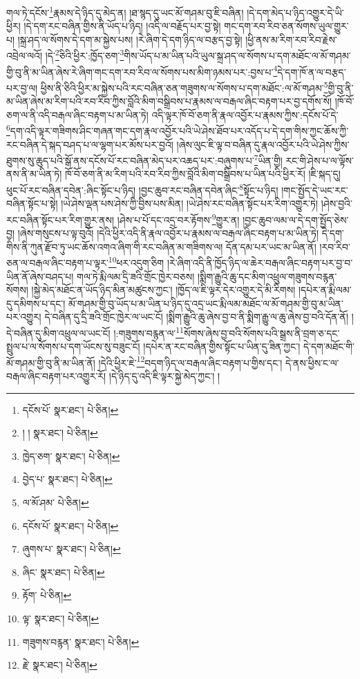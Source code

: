 གལ་ཏེ་དངོས་\footnote{དངོས་པོ་  སྣར་ཐང་།  པེ་ཅིན། }རྣམས་དེ་ཉིད་དུ་མེད་ན། །ཐ་སྙད་དུ་ཡང་མོ་གཤམ་བུ་ཇི་བཞིན། །དེ་དག་མེད་པ་ཉིད་འགྱུར་དེ་ཡི་ཕྱིར། །དེ་དག་རང་བཞིན་གྱིས་ནི་ཡོད་པ་ཉིད། །འདི་ལ་བརྗོད་པར་བྱ་སྟེ། གང་དག་རབ་རིབ་ཅན་སོགས་ཡུལ་གྱུར་པ། །སྐྲ་ཤད་ལ་སོགས་དེ་དག་མ་སྐྱེས་པས། །རེ་ཞིག་དེ་དག་ཉིད་ལ་བརྩད་བྱ་སྟེ། །ཕྱི་ནས་མ་རིག་རབ་རིབ་རྗེས་འབྲེལ་ལའོ། །དེ་\footnote{། །  སྣར་ཐང་།  པེ་ཅིན། }ཅིའི་ཕྱིར་:ཁྱོད་ཅག་\footnote{ཁྱེད་ཅག་  སྣར་ཐང་།  པེ་ཅིན། }གིས་ཡོད་པ་མ་ཡིན་པའི་ཡུལ་སྐྲ་ཤད་ལ་སོགས་པ་དག་མཐོང་ལ་མོ་གཤམ་གྱི་བུ་ནི་མ་ཡིན་ཞེས་རེ་ཞིག་གང་དག་རབ་རིབ་ལ་སོགས་པས་མིག་ཉམས་པར་:བྱས་པ་\footnote{བྱེད་པ་  སྣར་ཐང་།  པེ་ཅིན། }དེ་དག་ཁོ་ན་ལ་བརྩད་པར་བྱ་ལ། ཕྱིས་ནི་ཅིའི་ཕྱིར་མ་སྐྱེས་པའི་རང་བཞིན་ཅན་གཟུགས་ལ་སོགས་པ་དག་མཐོང་:ལ་མོ་གཤམ་\footnote{ལ་མོ་ཤམ་  པེ་ཅིན། }གྱི་བུ་ནི་མ་ཡིན་ཞེས་མ་རིག་པའི་རབ་རིབ་ཀྱིས་བློའི་མིག་བསྒྲིབས་པ་རྣམས་ལ་བརྒལ་ཞིང་བརྟག་པར་བྱ་དགོས་སོ། །ཁོ་བོ་ཅག་ལ་ནི་འདི་བརྒལ་ཞིང་བརྟག་པ་མ་ཡིན་ཏེ། འདི་ལྟར་ཁོ་བོ་ཅག་ནི་རྣལ་འབྱོར་པ་རྣམས་ཀྱིས་:དངོས་པོ་དེ་\footnote{དངོས་པོ་  སྣར་ཐང་།  པེ་ཅིན། }དག་འདི་ལྟར་གཟིགས་ཤིང་གཞན་གང་དག་རྣལ་འབྱོར་པའི་ཡེ་ཤེས་ཐོབ་པར་འདོད་པ་དེ་དག་གིས་ཀྱང་ཆོས་ཀྱི་རང་བཞིན་དེ་སྐད་བཤད་པ་ལ་ལྷག་པར་མོས་པར་བྱའོ། །ཞེས་ལུང་ཇི་ལྟ་བ་བཞིན་དུ་རྣལ་འབྱོར་པའི་ཡེ་ཤེས་ཀྱིས་ཐུགས་སུ་ཆུད་པའི་སྒོ་ནས་དངོས་པོ་རང་བཞིན་མེད་པར་འཆད་པར་:བཞུགས་པ་\footnote{ཞུགས་པ་  སྣར་ཐང་།  པེ་ཅིན། }ཡིན་གྱི། རང་གི་ཤེས་པ་ལ་ལྟོས་ནས་ནི་མ་ཡིན་ཏེ། ཁོ་བོ་ཅག་ནི་མ་རིག་པའི་རབ་རིབ་ཀྱིས་བློའི་མིག་བསྒྲིབས་པ་ཡིན་པའི་ཕྱིར་རོ། །ཇི་སྐད་དུ། ཕུང་པོ་རང་བཞིན་དབེན་:ཞིང་སྟོང་པ་ཉིད། །བྱང་ཆུབ་རང་བཞིན་དབེན་ཞིང་\footnote{ཞིང་  སྣར་ཐང་།  པེ་ཅིན། }སྟོང་པ་ཉིད། །གང་སྤྱོད་དེ་ཡང་རང་བཞིན་སྟོང་པ་སྟེ། །ཡེ་ཤེས་ལྡན་པས་ཤེས་ཀྱི་བྱིས་པས་མིན། །ཡེ་ཤེས་རང་བཞིན་སྟོང་པར་རིག་འགྱུར་ཏེ། །ཤེས་བྱའི་རང་བཞིན་སྟོང་པར་རིག་གྱུར་ནས། །ཤེས་པ་པོ་དང་འདྲ་བར་རྟོགས་\footnote{རྟོག་  པེ་ཅིན། }གྱུར་ན། །བྱང་ཆུབ་ལམ་ལ་དེ་དག་སྤྱོད་ཅེས་བྱ། །ཞེས་གསུངས་པ་ལྟ་བུའོ། །དེའི་ཕྱིར་འདི་ནི་རྣལ་འབྱོར་པ་རྣམས་ལ་བརྒལ་ཞིང་བརྟག་པ་མ་ཡིན་ཏེ། དེ་དག་གིས་ནི་ཀུན་རྫོབ་ཏུ་ཡང་ཆོས་འགའ་ཞིག་གི་རང་བཞིན་མ་གཟིགས་ལ། དོན་དམ་པར་ཡང་མ་ཡིན་ནོ། །རབ་རིབ་ཅན་ལ་བརྒལ་ཞིང་བརྟག་པ་ལྟར་\footnote{ལྟ་  སྣར་ཐང་།  པེ་ཅིན། }ཕར་འདུག་ཅིག །རེ་ཞིག་འདི་ནི་ཁྱོད་ཉིད་ལ་ཆེར་བརྒལ་ཞིང་བརྟག་པར་བྱ་བ་ཡིན་ནོ་ཞེས་བཤད་པ། གལ་ཏེ་རྨི་ལམ་དྲི་ཟའི་གྲོང་ཁྱེར་བཅས། །སྨིག་རྒྱུའི་ཆུ་དང་མིག་འཕྲུལ་གཟུགས་བརྙན་སོགས། །སྐྱེ་མེད་མཐོང་ན་ཡོད་ཉིད་མིན་མཚུངས་ཀྱང་། །ཁྱོད་ལ་ཇི་ལྟར་དེར་འགྱུར་དེ་མི་རིགས། །དཔེར་ན་རྨི་ལམ་དུ་དམིགས་པ་དང་། མོ་གཤམ་གྱི་བུ་ཡོད་པ་མ་ཡིན་པ་ཉིད་དུ་འདྲ་ཡང་རྨི་ལམ་མཐོང་ལ་མོ་གཤམ་གྱི་བུ་མ་ཡིན་པར་འགྱུར། དེ་བཞིན་དུ་དྲི་ཟའི་གྲོང་ཁྱེར་ལ་ཡང་ངོ། །སྨིག་རྒྱུའི་ཆུ་ཞེས་བྱ་བ་ནི་སྨིག་རྒྱུ་ལ་ཆུ་ཞེས་བྱ་བའི་དོན་ནོ། །དེ་བཞིན་དུ་མིག་འཕྲུལ་ལ་ཡང་ངོ། །:གཟུགས་བརྙན་ལ་\footnote{གཟུགས་བརྙན་  སྣར་ཐང་།  པེ་ཅིན། }སོགས་ཞེས་བྱ་བའི་སོགས་པའི་སྒྲས་ནི་བྲག་ཅ་དང་སྤྲུལ་པ་ལ་སོགས་པ་དག་ཡོངས་སུ་བཟུང་ངོ། །དཔེར་ན་རང་བཞིན་གྱིས་སྟོང་པ་ཡིན་དུ་ཟིན་ཀྱང་། དེ་དག་མཐོང་གི་མོ་གཤམ་གྱི་བུ་ནི་མ་ཡིན་ནོ། །དེའི་ཕྱིར་ཇེ་\footnote{རྗེ་  སྣར་ཐང་།  པེ་ཅིན། }བདག་ཉིད་ལ་བརྒལ་ཞིང་བརྟག་པ་གྱིས་དང་། དེ་ནས་ཕྱིས་ང་ལ་བརྒལ་ཞིང་བརྟག་པར་འགྱུར་རོ། །དེ་ཉིད་དུ་འདི་ཇི་ལྟར་སྐྱེ་མེད་ཀྱང་། །
